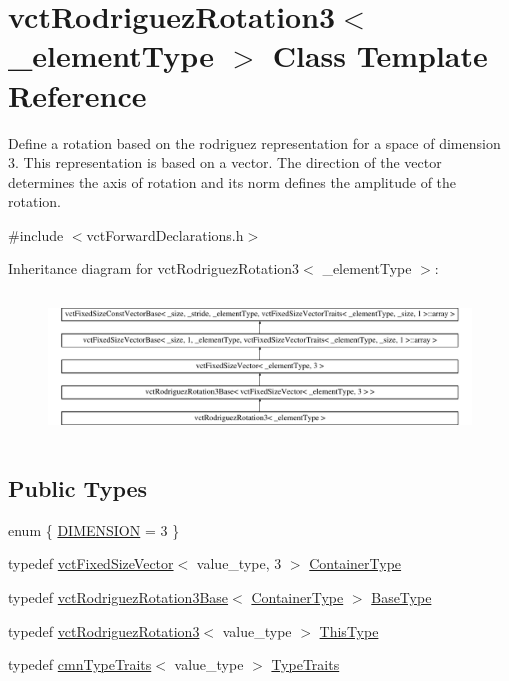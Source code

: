 \hypertarget{classvct_rodriguez_rotation3}{}\section{vct\+Rodriguez\+Rotation3$<$ \+\_\+element\+Type $>$ Class Template Reference}
\label{classvct_rodriguez_rotation3}


Define a rotation based on the rodriguez representation for a space of dimension 3. This representation is based on a vector. The direction of the vector determines the axis of rotation and its norm defines the amplitude of the rotation.  




{\ttfamily \#include $<$vct\+Forward\+Declarations.\+h$>$}

Inheritance diagram for vct\+Rodriguez\+Rotation3$<$ \+\_\+element\+Type $>$\+:\begin{figure}[H]
\begin{center}
\leavevmode
\includegraphics[height=3.888889cm]{dd/dc9/classvct_rodriguez_rotation3}
\end{center}
\end{figure}
\subsection*{Public Types}
\begin{DoxyCompactItemize}
\item 
enum \{ \hyperlink{group__cisst_vector_gga7a58a7aa413585bc569bcf1f22656ae3a8bdaaaae91a14fa58479067f59ed9145}{D\+I\+M\+E\+N\+S\+I\+O\+N} = 3
 \}
\item 
typedef \hyperlink{classvct_fixed_size_vector}{vct\+Fixed\+Size\+Vector}$<$ value\+\_\+type, 3 $>$ \hyperlink{classvct_rodriguez_rotation3_a14522bb406d3c5c520025d6f1c5f0a82}{Container\+Type}
\item 
typedef \hyperlink{classvct_rodriguez_rotation3_base}{vct\+Rodriguez\+Rotation3\+Base}$<$ \hyperlink{classvct_rodriguez_rotation3_a14522bb406d3c5c520025d6f1c5f0a82}{Container\+Type} $>$ \hyperlink{classvct_rodriguez_rotation3_a9808e8703a58127607921c08914bda40}{Base\+Type}
\item 
typedef \hyperlink{classvct_rodriguez_rotation3}{vct\+Rodriguez\+Rotation3}$<$ value\+\_\+type $>$ \hyperlink{classvct_rodriguez_rotation3_ae212ce4b566eec4c0083226a64ffd0de}{This\+Type}
\item 
typedef \hyperlink{classcmn_type_traits}{cmn\+Type\+Traits}$<$ value\+\_\+type $>$ \hyperlink{classvct_rodriguez_rotation3_a3b8344626fa072324c1dd4e2384f254f}{Type\+Traits}
\end{DoxyCompactItemize}
